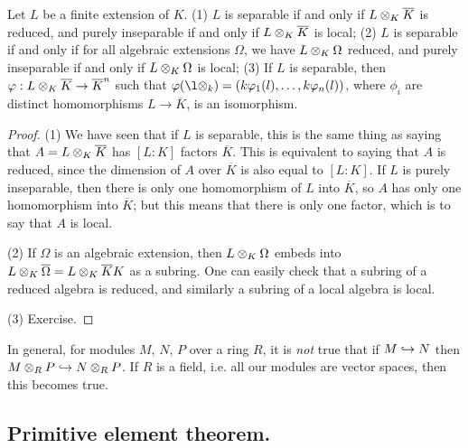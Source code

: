 \begin{dfn}
\begin{dfn}
\begin{thm}
Let $L$ be a finite extension of $K$.
(1) $L$ is separable if and only if $L \otimes_{K} \overline{K}$ is reduced, and purely inseparable if and only if $L \otimes_{K} \overline{K}$ is local;
(2) $L$ is separable if and only if for all algebraic extensions $\Omega$, we have $L \otimes_{K} \Omega$ reduced, and purely inseparable if and only if $L \otimes_{K} \Omega$ is local;
(3) If $L$ is separable, then $\varphi: L\otimes_{K} \overline{K} \to \overline{K}^n$ such that $\phi(\l \tensor k) = ( k \phi_1(l), \dotsc, k \phi_n(l) )$, where $\phi_i$ are distinct homomorphisms $L \to \overline{K}$, is an isomorphism.
\end{thm}
\begin{proof}
(1) We have seen that if $L$ is separable, this is the same thing as saying that $A = L \otimes_{K} \overline{K}$ has $[L:K]$ factors $\overline{K}$. 
This is equivalent to saying that $A$ is reduced, since the dimension of $A$ over $\overline{K}$ is also equal to $[L : K]$.
If $L$ is purely inseparable, then there is only one homomorphism of $L$ into $\overline{K}$, so $A$ has only one homomorphism into $\overline{K}$; but this means that there is only one factor, which is to say that $A$ is local.

(2) If $\Omega$ is an algebraic extension, then $L \otimes_{K} \Omega$ embeds into $L \otimes_{K} \overline{\Omega} = L \otimes_{K} \overline{K}K$ as a subring. 
One can easily check that a subring of a reduced algebra is reduced, and similarly a subring of a local algebra is local.

(3) Exercise.
\end{proof}

\begin{rmk}
In general, for modules $M$, $N$, $P$ over a ring $R$, it is \emph{not} true that if $M \hookrightarrow N$ then $M \otimes_{R} P \hookrightarrow N \otimes_{R} P$. 
If $R$ is a field, i.e. all our modules are vector spaces, then this becomes true.
\end{rmk}

\subsection{Primitive element theorem.}


\end{dfn}
\end{dfn}
